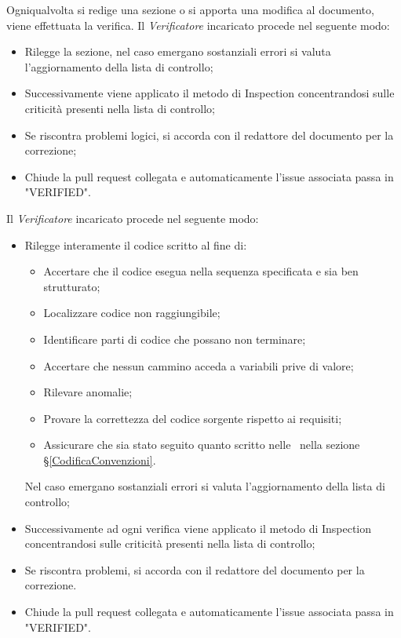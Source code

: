 \label{VerificaDocumentazione}Ogniqualvolta si redige una sezione o si apporta una modifica al documento, viene effettuata la verifica. Il \textit{Verificatore} incaricato procede nel seguente modo:
\begin{itemize}
	\item Rilegge la sezione, nel caso emergano sostanziali errori si valuta l'aggiornamento della lista di controllo;
	\item Successivamente viene applicato il metodo di Inspection concentrandosi sulle criticità presenti nella lista di controllo;
	\item Se riscontra problemi logici, si accorda con il redattore del documento per la correzione;
	\item Chiude la pull request collegata e automaticamente l'issue associata passa in "VERIFIED".
\end{itemize}

\label{VerificaCodice}Il \textit{Verificatore} incaricato procede nel seguente modo:
\begin{itemize}
	\item Rilegge interamente il codice scritto al fine di:
	\begin{itemize}
		\item Accertare che il codice esegua nella sequenza specificata e sia ben strutturato;
		\item Localizzare codice non raggiungibile;
		\item Identificare parti di codice che possano non terminare;
		\item Accertare che nessun cammino acceda a variabili prive di valore;
		\item Rilevare anomalie;
		\item Provare la correttezza del codice sorgente rispetto ai requisiti;
		\item Assicurare che sia stato seguito quanto scritto nelle \NdPv\ nella sezione \S\ref{CodificaConvenzioni}.
	\end{itemize}
	Nel caso emergano sostanziali errori si valuta l'aggiornamento della lista di controllo;
	\item Successivamente ad ogni verifica viene applicato il metodo di Inspection concentrandosi sulle criticità presenti nella lista di controllo;
	\item Se riscontra problemi, si accorda con il redattore del documento per la correzione. 
	\item Chiude la pull request collegata e automaticamente l'issue associata passa in "VERIFIED".
\end{itemize}

